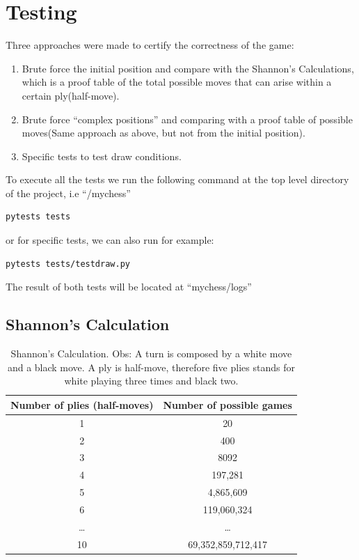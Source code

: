 \documentclass[10pt]{article}
\begin{document}
\section{Testing}

Three approaches were made to certify the correctness of the game:

\begin{enumerate}[label=\arabic*)]
\item Brute force the initial position and compare with the Shannon's
    Calculations, which is a proof table of the total possible moves
    that can arise within a certain ply(half-move).
\item Brute force ``complex positions'' and comparing with a proof table of possible
    moves(Same approach as above, but not from the initial position).
\item Specific tests to test draw conditions.
\end{enumerate}

To execute all the tests we run the following command at the top level directory
of the project, i.e ``/mychess''
\begin{lstlisting}
pytests tests
\end{lstlisting}

or for specific tests, we can also run for example:

\begin{lstlisting}
pytests tests/testdraw.py
\end{lstlisting}

The result of both tests will be located at ``mychess/logs''


\subsection{Shannon's Calculation}


\begin{table}[H]
\center
\begin{tabular}{|c|c|}
\hline
\textbf{Number of plies (half-moves)}  & \textbf{Number of possible games}  \\
\hline
  1   & 20 \\
\hline
   2  &  400 \\
\hline
  3   & 8092 \\
\hline
4  & 197,281 \\
\hline
5   & 4,865,609 \\
\hline
6   & 119,060,324 \\
\hline
\ldots & \ldots \\
\hline
10 & 69,352,859,712,417 \\
\hline
\end{tabular}
\caption{Shannon's Calculation. Obs: A turn is composed by a white move and a
    black move. A ply is half-move, therefore five plies
stands for white playing three times and black two.}
\end{table}
\end{document}
